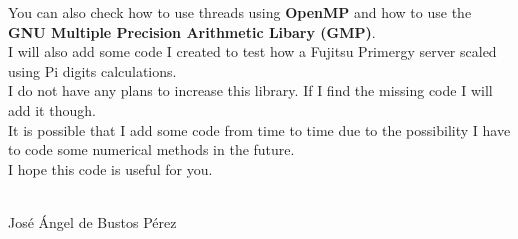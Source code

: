 You can also check how to use threads using \textbf{OpenMP} and how to use the \textbf{GNU Multiple Precision Arithmetic Libary (GMP)}.\\

I will also add some code I created to test how a Fujitsu Primergy server scaled using Pi digits calculations.\\

I do not have any plans to increase this library. If I find the missing code I will add it though.\\

It is possible that I add some code from time to time due to the possibility I have to code some numerical methods in the future.\\

I hope this code is useful for you.\\ \\

\begin{flushright}
Jos\'e \'Angel de Bustos P\'erez  
\end{flushright}
